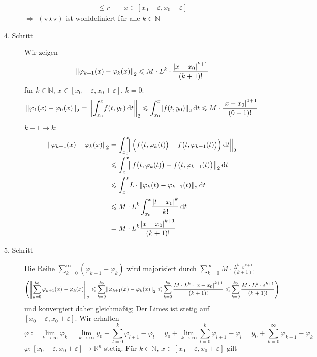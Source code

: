 \begin{description}
\begin{align*}
		\le r \qquad x \in [x_0 -\varepsilon, x_0 +\varepsilon]
	\end{align*}
	$\Rightarrow $ $(\star\star\star)$ ist wohldefiniert für alle $k \in \mathds{N}$
	\item[4. Schritt] Wir zeigen 
	\begin{align*}
		\norm[2]{\varphi_{k+1}(x)- \varphi_k(x)} \le M \cdot L^k \cdot \frac{\abs*{x-x_0}^{k+1} }{(k+1)!} 
	\end{align*}
	für $k \in \mathds{N}$, $x \in [x_0 -\varepsilon, x_0 +\varepsilon]$. $k=0$: 
	\[
		\norm[2]{\varphi_1(x) - \varphi_0(x)} = \norm[2]{\int_{x_0} ^{x} \! f(t,y_0)  \, \mathrm{d}t}  \le \int_{x_0} ^{x} \! \norm[2]{f(t,y_0)}  \, \mathrm{d}t 
		\le M \cdot \frac{\abs*{x-x_0}^{0+1} }{(0+1)!}
	\]
	$k-1 \mapsto k$:
	\begin{align*}
		\norm[2]{\varphi_{k+1}(x) - \varphi_k(x)} &= \int_{x_0} ^{x} \! \norm[2]{\Big(f\big(t, \varphi_k(t)\big) - f\big(t, \varphi_{k-1}(t)\big)\Big)  \, \mathrm{d}t} \\
		&\le \int_{x_0} ^{x} \! \norm[2]{f\big(t,\varphi_k(t)\big) -f\big(t, \varphi_{k-1}(t)\big) }  \, \mathrm{d}t \\
		&\le  \int_{x_0} ^{x} \! L \cdot \norm[2]{\varphi_k(t) - \varphi_{k-1}(t)}  \, \mathrm{d}t \\
		&\le M \cdot L^k \int_{x_0} ^{x} \! \frac{\abs*{t-x_0}^k}{k!}  \, \mathrm{d}t \\
		&= M \cdot L^k \frac{\abs*{x-x_0}^{k+1} }{(k+1)!} 
	\end{align*}
	\item[5. Schritt] Die Reihe $\sum_{k=0}^{\infty} (\varphi_{k+1} - \varphi_{k})$ wird majorisiert durch 
	$\sum_{k=0}^{\infty} M \cdot \frac{L^k \cdot \varepsilon^{k+1}}{(k+1)!}  $
	\begin{align*}
		\enbrace*{\norm[2]{\sum_{k=0}^{k_0} \varphi_{k+1}(x) - \varphi_{k}(x)} \le \sum_{k=0}^{k_0}  \norm[2]{\varphi_{k+1}(x) - \varphi_{k}(x)}  \le  \sum_{k=0}^{k_0}
		\frac{M \cdot L^k \cdot \abs*{x-x_0}^{k+1} }{(k+1)!}  \le \sum_{k=0}^{k_0} \frac{M \cdot L^k \cdot \varepsilon^{k+1}}{(k+1)!} }
	\end{align*}
	und konvergiert daher gleichmäßig; Der Limes ist stetig auf $[x_0 -\varepsilon, x_0 +\varepsilon]$. Wir erhalten 
	\[
		\varphi := \lim_{ k \to \infty} \varphi_k =  \lim_{ k \to \infty} y_0 + \sum_{l=0}^{k} \varphi_{l+1}- \varphi_l = y_0 + \lim_{ k \to \infty} \sum_{l=0}^{k}
		\varphi_{l+1} - \varphi_l = y_0 + \sum_{k=0}^{\infty} \varphi_{k+1} - \varphi_{k}
	\]
	$\varphi : [x_0 -\varepsilon, x_0 +\varepsilon] \to \mathds{R}^n$ stetig. Für $k \in \mathds{N}$, $x \in [x_0 -\varepsilon, x_0 +\varepsilon]$ gilt 

\end{description}
